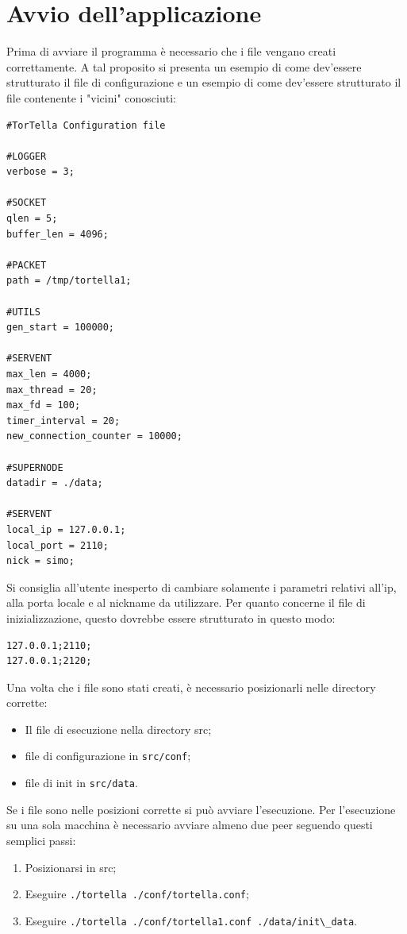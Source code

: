 \section{Avvio dell'applicazione}
Prima di avviare il programma è necessario che i file vengano creati correttamente. A tal proposito si presenta un esempio di come dev'essere strutturato il file di configurazione e un esempio di come dev'essere strutturato il file contenente i "vicini" conosciuti:
\begin{lstlisting}
#TorTella Configuration file

#LOGGER
verbose = 3;

#SOCKET
qlen = 5;
buffer_len = 4096;

#PACKET
path = /tmp/tortella1;

#UTILS
gen_start = 100000;

#SERVENT
max_len = 4000;
max_thread = 20;
max_fd = 100;
timer_interval = 20;
new_connection_counter = 10000;

#SUPERNODE
datadir = ./data;

#SERVENT
local_ip = 127.0.0.1;
local_port = 2110;
nick = simo;
\end{lstlisting}
Si consiglia all'utente inesperto di cambiare solamente i parametri relativi all'ip, alla porta locale e al nickname da utilizzare.
Per quanto concerne il file di inizializzazione, questo dovrebbe essere strutturato in questo modo:
\begin{lstlisting}
127.0.0.1;2110;
127.0.0.1;2120;
\end{lstlisting}
Una volta che i file sono stati creati, è necessario posizionarli nelle directory corrette:
\begin{itemize}
\item Il file di esecuzione nella directory src;
\item file di configurazione in \lstinline{src/conf};
\item file di init in \lstinline{src/data}.
\end{itemize}
Se i file sono nelle posizioni corrette si può avviare l'esecuzione. Per l'esecuzione su una sola macchina è necessario avviare almeno due peer seguendo questi semplici passi:
\begin{enumerate}
\item Posizionarsi in src;
\item Eseguire \lstinline{./tortella ./conf/tortella.conf};
\item Eseguire \lstinline{./tortella ./conf/tortella1.conf ./data/init\_data}. 
\end{enumerate}
